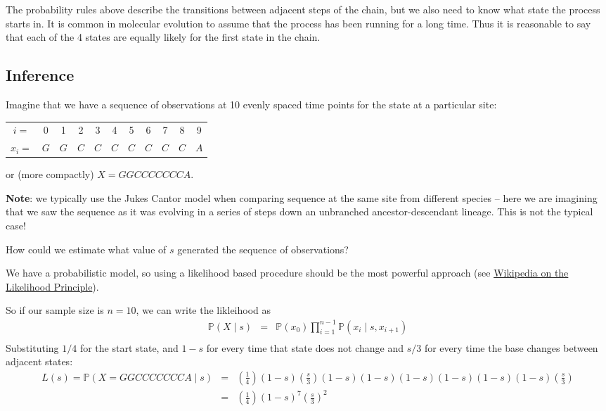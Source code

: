 \documentclass[11pt]{article}
\renewcommand{\Pr}{\mathbb{P}}
\newcommand{\href}[2]{\url{#2}}
\begin{document}
The probability rules above describe the transitions between adjacent steps of the chain,
    but we also need to know what state the process starts in.
It is common in molecular evolution to assume that the process has been running for a long time.
Thus it is reasonable to say that each of the 4 states are equally likely for the first state in
    the chain.

\subsection*{Inference}
Imagine that we have a sequence of observations at 10 evenly spaced time points for the state at a
particular site:\\
\begin{tabular}{ccccccccccc}
$i=$   & 0 & 1 & 2 & 3 & 4 & 5 & 6 & 7 & 8 & 9\\
$x_i=$ & $G$ & $G$ & $C$ & $C$ & $C$ & $C$ & $C$ & $C$ & $C$ & $A$
\end{tabular}
or (more compactly) $X=GGCCCCCCCA$.

{\bf Note}: we typically use the Jukes Cantor model when comparing sequence at the same site from
    different species -- here we are imagining that we saw the sequence as it was evolving in
    a series of steps down an unbranched  ancestor-descendant lineage. This is not the typical case!

How could we estimate what value of $s$ generated the sequence of observations?

We have a probabilistic model, so using a likelihood based procedure should be the most powerful
  approach (see
  \href{https://en.wikipedia.org/wiki/Likelihood_principle}{Wikipedia on the Likelihood Principle}).

So if our sample size is $n = 10$, we can write the likleihood as
\begin{eqnarray*}
\Pr(X\mid s) & = & \Pr(x_0)\prod_{i=1}^{n-1} \Pr(x_i \mid s, x_{i+1})\\
\end{eqnarray*}
Substituting $1/4$ for the start state, and $1-s$ for every time that state does not change and
$s/3$ for every time the base changes between adjacent states:
\begin{eqnarray*}
L(s) = \Pr(X=GGCCCCCCCA\mid s) & = & \left(\frac{1}{4}\right)(1-s)\left(\frac{s}{3}\right)(1-s)(1-s)(1-s)(1-s)(1-s)(1-s)\left(\frac{s}{3}\right)\\
 & = & \left(\frac{1}{4}\right)(1-s)^7\left(\frac{s}{3}\right)^2
\end{eqnarray*}
\end{document}
